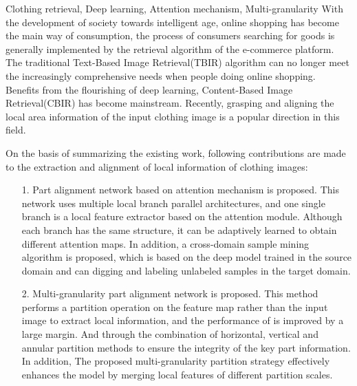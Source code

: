\documentclass[figurelist,tablelist,algorithmlist,nomlist,masters]{Style/seuthesix}
\begin{document}
\begin{englishabstract}{Clothing retrieval, Deep learning, Attention mechanism, Multi-granularity}
  With the development of society towards intelligent age, online shopping has become the main way of consumption, 
  the process of consumers searching for goods is generally implemented by the retrieval algorithm of the e-commerce platform. 
  The traditional Text-Based Image Retrieval(TBIR)
  algorithm can no longer meet the increasingly comprehensive needs when people doing online shopping. Benefits from the flourishing of deep learning, 
  Content-Based Image Retrieval(CBIR) has become mainstream. Recently, grasping and aligning the local area information of the input  clothing image is a 
  popular direction in this field. 
  
  On the basis of summarizing the existing work, following contributions are made to the extraction and alignment of local information 
  of clothing images:
  \begin{itemize}
    \item[1.]Part alignment network based on attention mechanism is proposed. This network uses multiple local branch parallel architectures, 
      and one single branch is a local feature extractor based on the attention module. Although each branch has the same structure, it can be adaptively learned to obtain different attention maps.
      In addition, a cross-domain sample mining algorithm is proposed, which is based on the deep model trained in the source domain and can digging and labeling unlabeled samples in the target domain.
    \item[2.]Multi-granularity part alignment network is proposed. This method performs a partition operation on the feature map rather than the input image to extract local information, 
      and the performance of is improved by a large margin. And through the combination of horizontal, vertical and annular partition methods to ensure the integrity of the key part information.
      In addition, The proposed multi-granularity partition strategy effectively enhances the model by merging local features of different partition scales.
  \end{itemize}
  \vspace{3ex}
\end{englishabstract}

\tableofcontents
\listofothers

\mainmatter


%



\end{document}
